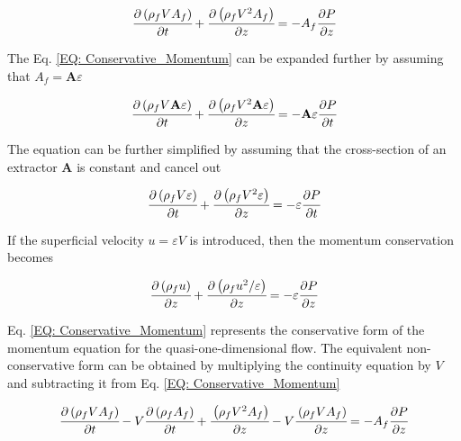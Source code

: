 \documentclass[../Parameter_fitting.tex]{subfiles}
\begin{document}
	{\footnotesize
		\begin{equation}
			\cfrac{\partial \left( \rho_f V A_f \right)}{\partial t} + \cfrac{\partial \left( \rho_f V^2 A_f \right)}{\partial z} = -A_f \cfrac{\partial P}{\partial z}
			\label{EQ: Conservative_Momentum}
		\end{equation}
	}

	The Eq. \ref{EQ: Conservative_Momentum} can be expanded further by assuming that $A_f = \textbf{A}\varepsilon$ 
	
	{\footnotesize
		\begin{equation}
			\cfrac{\partial \left( \rho_f V \textbf{A} \varepsilon \right) }{\partial t} + \cfrac{\partial \left( \rho_f V^2 \textbf{A} \varepsilon \right) }{\partial z} = - 	\textbf{A} \varepsilon \cfrac{\partial P}{\partial t}
		\end{equation}
	}

	The equation can be further simplified by assuming that the cross-section of an extractor $\textbf{A}$ is constant and cancel out
	
	{\footnotesize
		\begin{equation}
			\cfrac{\partial \left( \rho_f V \varepsilon \right) }{\partial t} + \cfrac{\partial \left( \rho_f V^2 \varepsilon \right) }{\partial z} = - \varepsilon 	\cfrac{\partial P}{\partial t}
		\end{equation}
	}

	If the superficial velocity $u=\varepsilon V$ is introduced, then the momentum conservation becomes
	
	{\footnotesize
		\begin{equation}
			\cfrac{\partial \left( \rho_f u \right)}{\partial z} + \cfrac{\partial \left( \rho_f u^2/\varepsilon \right) }{\partial z} = -\varepsilon \cfrac{\partial 	P}{\partial z}
		\end{equation}
	}

	Eq. \ref{EQ: Conservative_Momentum} represents the conservative form of the momentum equation for the quasi-one-dimensional flow. The equivalent non-conservative form can be obtained by multiplying the continuity equation by $V$ and subtracting it from Eq. \ref{EQ: Conservative_Momentum}
	
	{\footnotesize
		\begin{equation}
			\cfrac{\partial \left( \rho_f V A_f \right)}{\partial t} - V\cfrac{ \partial \left( \rho_f A_f \right) }{\partial t} + \cfrac{\left( \rho_f V^2 A_f 	\right)}{\partial z} - V \cfrac{\left( \rho_f V A_f \right)}{\partial z} = -A_f \cfrac{\partial P}{\partial z}
		\end{equation}
	}
	
\end{document}
